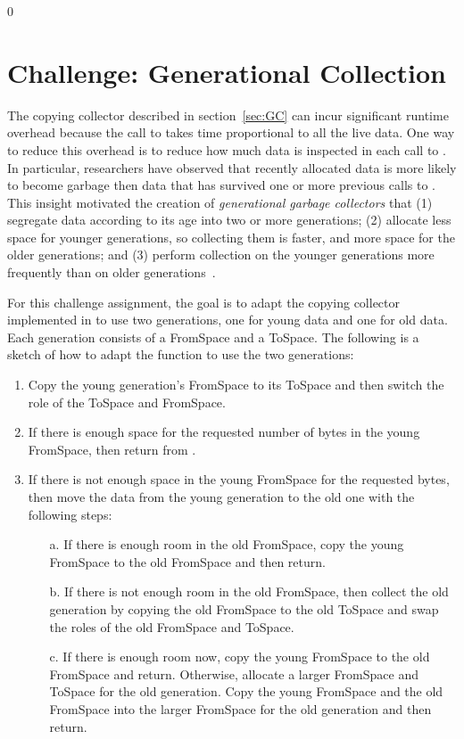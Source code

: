 \documentclass[7x10]{TimesAPriori_MIT}%
\def\racketEd{0}
\def\edition{1}
\numberwithin{theorem}{chapter}
\numberwithin{definition}{chapter}
\numberwithin{equation}{chapter}
\begin{document}
{\if\edition\racketEd
\section{Challenge: Generational Collection}

The copying collector described in section~\ref{sec:GC} can incur
significant runtime overhead because the call to  takes
time proportional to all the live data. One way to reduce this
overhead is to reduce how much data is inspected in each call to
. In particular, researchers have observed that recently
allocated data is more likely to become garbage then data that has
survived one or more previous calls to . This insight
motivated the creation of \emph{generational garbage collectors}
 that
(1) segregate data according to its age into two or more generations;
(2) allocate less space for younger generations, so collecting them is
faster, and more space for the older generations; and (3) perform
collection on the younger generations more frequently than on older
generations~\citep{Wilson:1992fk}.

For this challenge assignment, the goal is to adapt the copying
collector implemented in  to use two generations, one
for young data and one for old data. Each generation consists of a
FromSpace and a ToSpace. The following is a sketch of how to adapt the
 function to use the two generations:

\begin{enumerate}
\item Copy the young generation's FromSpace to its ToSpace and then
  switch the role of the ToSpace and FromSpace.
\item If there is enough space for the requested number of bytes in
  the young FromSpace, then return from .
\item If there is not enough space in the young FromSpace for the
  requested bytes, then move the data from the young generation to the
  old one with the following steps:
  \begin{enumerate}
  \item[a.] If there is enough room in the old FromSpace, copy the young
    FromSpace to the old FromSpace and then return.
  \item[b.] If there is not enough room in the old FromSpace, then collect
    the old generation by copying the old FromSpace to the old ToSpace
    and swap the roles of the old FromSpace and ToSpace.
  \item[c.] If there is enough room now, copy the young FromSpace to the
    old FromSpace and return. Otherwise, allocate a larger FromSpace
    and ToSpace for the old generation.  Copy the young FromSpace and
    the old FromSpace into the larger FromSpace for the old
    generation and then return.
  \end{enumerate}
\end{enumerate}

}
\end{document}
